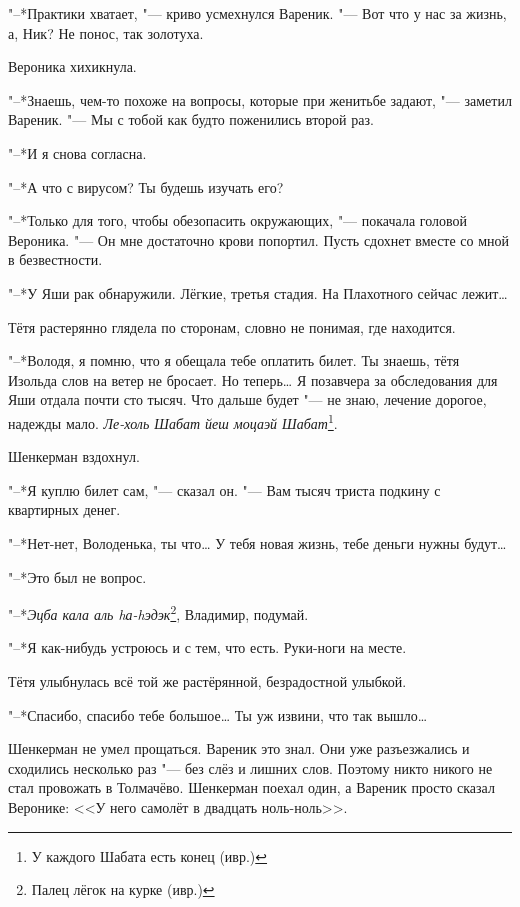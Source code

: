 "--*Практики хватает, "--- криво усмехнулся Вареник.
"--- Вот что у нас за жизнь, а, Ник?
Не понос, так золотуха.

Вероника хихикнула.

"--*Знаешь, чем-то похоже на вопросы, которые при женитьбе задают, "--- заметил Вареник.
"--- Мы с тобой как будто поженились второй раз.

"--*И я снова согласна.

"--*А что с вирусом?
Ты будешь изучать его?

"--*Только для того, чтобы обезопасить окружающих, "--- покачала головой Вероника.
"--- Он мне достаточно крови попортил.
Пусть сдохнет вместе со мной в безвестности.

\asterism

\textspace

"--*У Яши рак обнаружили.
Лёгкие, третья стадия.
На Плахотного сейчас лежит\ldots{}

Тётя растерянно глядела по сторонам, словно не понимая, где находится.

"--*Володя, я помню, что я обещала тебе оплатить билет.
Ты знаешь, тётя Изольда слов на ветер не бросает.
Но теперь\ldots{}
Я позавчера за обследования для Яши отдала почти сто тысяч.
Что дальше будет "--- не знаю, лечение дорогое, надежды мало.
\textit{Ле-холь Шабат йеш моцаэй Шабат}\footnote{У каждого Шабата есть конец (ивр.)}.

Шенкерман вздохнул.

"--*Я куплю билет сам, "--- сказал он.
"--- Вам тысяч триста подкину с квартирных денег.

"--*Нет-нет, Володенька, ты что\ldots{}
У тебя новая жизнь, тебе деньги нужны будут\ldots{}

"--*Это был не вопрос.

"--*\textit{Эцба кала аль hа-hэдэк}\footnote{Палец лёгок на курке (ивр.)}, Владимир, подумай.

"--*Я как-нибудь устроюсь и с тем, что есть.
Руки-ноги на месте.

Тётя улыбнулась всё той же растёрянной, безрадостной улыбкой.

"--*Спасибо, спасибо тебе большое\ldots{}
Ты уж извини, что так вышло\ldots{}

\asterism

\label{Fri_2012_10_19}

Шенкерман не умел прощаться.
Вареник это знал.
Они уже разъезжались и сходились несколько раз "--- без слёз и лишних слов.
Поэтому никто никого не стал провожать в Толмачёво.
Шенкерман поехал один, а Вареник просто сказал Веронике:
<<У него самолёт в двадцать ноль-ноль>>.

